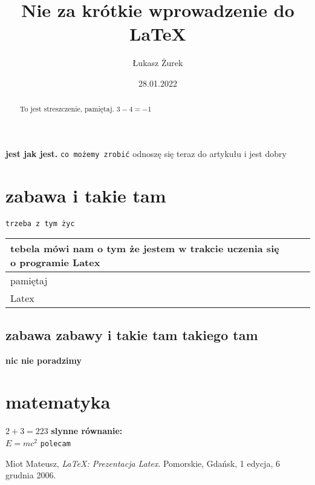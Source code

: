 \documentclass[12pt,a4paper]{article}
\title{Nie za krótkie wprowadzenie do \LaTeX}
\author{Łukasz Żurek}
\date{28.01.2022}
\begin{document}
\maketitle

\begin{abstract}
    To jest streszczenie, pamiętaj.
	$3 - 4 = -1$
\end{abstract}
\newpage
\textbf {jest jak jest.}
	\texttt {co możemy zrobić}
\tableofcontents
odnoszę się teraz do artykułu i jest dobry 
\newpage
\section{zabawa i takie tam }
	\texttt {trzeba z tym życ}
\begin{tabular}{|l|cr|}
\hline tebela mówi nam o tym że jestem w trakcie uczenia się o programie Latex \\ \hline
\hline pamiętaj \\ \hline
\hline Latex \\ \hline
\end{tabular}
	\subsection{zabawa zabawy i takie tam takiego tam}
		\textbf {nic nie poradzimy}
\newpage
\section{matematyka}
	\textrm {$2 + 3 = 223$}
	\textbf {slynne równanie:} \\
	$E = mc^2$
	\texttt {polecam}
\newpage


\begin{thebibliography}{9}

  Miot Mateusz,
  \emph{\LaTeX: Prezentacja Latex}.
  Pomorskie, Gdańsk,
  1 edycja,
  6 grudnia 2006.

\end{thebibliography}
\end{document}
